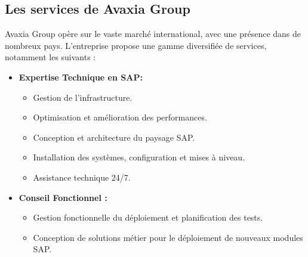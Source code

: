 \subsection{Les services de Avaxia Group \cite{serAvaxia}}
\par Avaxia Group opère sur le vaste marché international, avec une présence dans de nombreux pays. L'entreprise propose une gamme diversifiée de services, notamment les suivants :

\begin{itemize}

    \item \textbf{Expertise Technique en SAP: }
    \begin{itemize}
        \item  Gestion de l'infrastructure.
        \item  Optimisation et amélioration des performances.
        \item  Conception et architecture du paysage SAP.
        \item  Installation des systèmes, configuration et mises à niveau.
        \item  Assistance technique 24/7.
    \end{itemize}
    \item \textbf{Conseil Fonctionnel : }
            \begin{itemize}
                \item  Gestion fonctionnelle du déploiement et planification des tests.
                \item  Conception de solutions métier pour le déploiement de nouveaux modules SAP.
        

\end{itemize}
\end{itemize}
